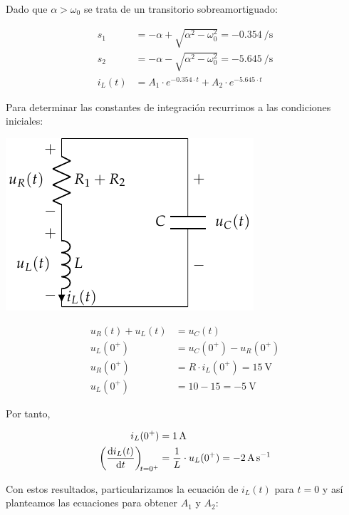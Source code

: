 \bigskip

Dado que $\alpha > \omega_0$ se trata de un transitorio
sobreamortiguado:

\begin{align*}
  s_1 &= -\alpha + \sqrt{\alpha^2 - \omega_0^2} = \SI{-0.354}{\per\second}\\
  s_2 &= -\alpha - \sqrt{\alpha^2 - \omega_0^2} = \SI{-5.645}{\per\second}\\
  i_L(t) &= A_1 \cdot e^{-0.354 \cdot t} + A_2 \cdot e^{-5.645 \cdot t}
\end{align*}

Para determinar las constantes de integración recurrimos a las
condiciones iniciales:

\bigskip

\begin{minipage}{0.3\textwidth}
  \includegraphics[scale=0.8]{figuras/FM_4_8_natural}
\end{minipage}
\begin{minipage}{0.7\textwidth}
  \begin{align*}
    u_R(t) + u_L(t) &= u_C(t)\\
    u_L(0^+) &= u_C(0^+) - u_R(0^+)\\
    u_R(0^+) &= R \cdot i_L(0^+) = \SI{15}{\volt}\\
    u_L(0^+) &= 10 - 15 = \SI{-5}{\volt}
  \end{align*}
\end{minipage}

\bigskip

Por tanto,

\begin{align*}
  i_L(0^+) &= \SI{1}{\ampere}\\
  \diff{i_L(t)}{t}[t = 0^+] &= \frac{1}{L} \cdot u_L(0^+) = \SI{-2}{\ampere\per\second}
\end{align*}

Con estos resultados, particularizamos la ecuación de $i_L(t)$ para
$t = 0$ y así planteamos las ecuaciones para obtener $A_1$ y $A_2$:

